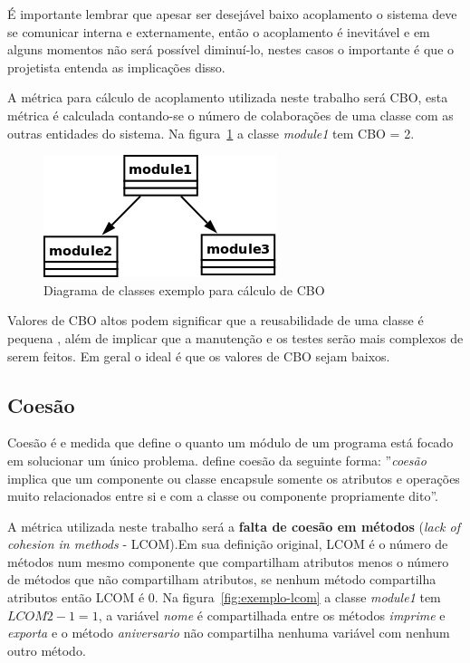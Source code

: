 É importante lembrar que apesar ser desejável baixo acoplamento o sistema deve
se comunicar interna e externamente, então o acoplamento é inevitável e em
alguns momentos não será possível diminuí-lo, nestes casos o importante é que
o projetista entenda as implicações disso.

A métrica para cálculo de acoplamento utilizada neste trabalho será CBO, esta
métrica é calculada contando-se o número de colaborações de uma classe com as
outras entidades do sistema. Na figura~\ref{fig:exemplo-cbo} a classe {\it
module1} tem CBO = 2.

\begin{figure}[h]
\center
\includegraphics[scale=0.4]{imagens/exemplo-cbo}
\caption{Diagrama de classes exemplo para cálculo de CBO}
\label{fig:exemplo-cbo}
\end{figure}

Valores de CBO altos podem significar que a reusabilidade de uma classe é
pequena \cite{engenhariaDeSoftwarePressman}, além de implicar que a manutenção
e os testes serão mais complexos de serem feitos. Em geral o ideal é que os
valores de CBO sejam baixos.

\subsection{Coesão}

Coesão é e medida que define o quanto um módulo de um programa está focado em
solucionar um único problema.  define
coesão da seguinte forma: ''{\it coesão} implica que um componente ou classe
encapsule somente os atributos e operações muito relacionados entre si e com a
classe ou componente propriamente dito''.

A métrica utilizada neste trabalho será a {\bf falta de coesão em métodos}
({\it lack of cohesion in methods} - LCOM).Em sua definição original, LCOM é
o número de métodos num mesmo componente que compartilham atributos menos o
número de métodos que não compartilham atributos, se nenhum método compartilha
atributos então LCOM é 0. Na figura~\ref{fig:exemplo-lcom} a classe {\it
module1} tem $LCOM 2 - 1 = 1$, a variável {\it nome} é compartilhada entre
os métodos {\it imprime} e {\it exporta} e o método {\it aniversario} não
compartilha nenhuma variável com nenhum outro método.

